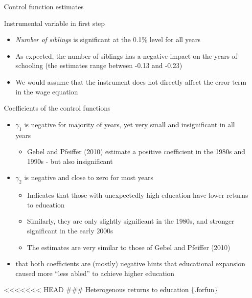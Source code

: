 \documentclass[10pt,ignorenonframetext,]{beamer}
\providecommand{\tightlist}{%
  \setlength{\itemsep}{0pt}\setlength{\parskip}{0pt}}
\begin{document}
\begin{frame}[allowframebreaks]{Control function estimates}
\protect\hypertarget{control-function-estimates}{}

Instrumental variable in first step

\begin{itemize}
\tightlist
\item
  \emph{Number of siblings} is significant at the 0.1\% level for all
  years
\item
  As expected, the number of siblings has a negative impact on the years
  of schooling (the estimates range between -0.13 and -0.23)
\item
  We would assume that the instrument does not directly affect the error
  term in the wage equation
\end{itemize}

Coefficients of the control functions

\begin{itemize}
\tightlist
\item
  \(\gamma_1\) is negative for majority of years, yet very small and
  insignificant in all years

  \begin{itemize}
  \tightlist
  \item
    Gebel and Pfeiffer (2010) estimate a positive coefficient in the
    1980s and 1990s - but also insignificant
  \end{itemize}
\item
  \(\gamma_2\) is negative and close to zero for most years

  \begin{itemize}
  \tightlist
  \item
    Indicates that those with unexpectedly high education have lower
    returns to education
  \item
    Similarly, they are only slightly significant in the 1980s, and
    stronger significant in the early 2000s
  \item
    The estimates are very similar to those of Gebel and Pfeiffer (2010)
  \end{itemize}
\item
  that both coefficients are (mostly) negative hints that educational
  expansion caused more ``less abled'' to achieve higher education
\end{itemize}

\textless{}\textless{}\textless{}\textless{}\textless{}\textless{}\textless{}
HEAD \#\#\# Heterogenous returns to education \{.forfun\}


\end{frame}
\end{document}
